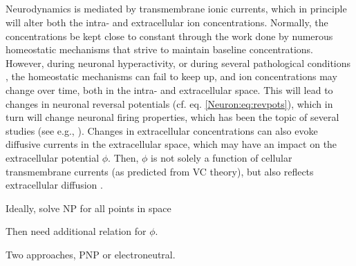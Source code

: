 {\subsection{}
Neurodynamics is mediated by transmembrane ionic currents, which in principle will alter both the intra- and extracellular ion concentrations. Normally, the concentrations be kept close to constant through the work done by numerous homeostatic mechanisms that strive to maintain baseline concentrations. However, during neuronal hyperactivity, or during several pathological conditions  \cite{Somjen2001, Frohlich2008, Zandt2015review, Ayata2015}, the homeostatic mechanisms can fail to keep up, and ion concentrations may change over time, both in the intra- and extracellular space. This will lead to changes in neuronal reversal potentials (cf. eq. \ref{Neuron:eq:revpots}), which in turn will change neuronal firing properties, which has been the topic of several studies (see e.g., \cite{Qian1989, Cressman2009, Oyehaug2009, Zandt2011, Saetra2020}). Changes in extracellular concentrations can also evoke diffusive currents in the extracellular space, which may have an impact on the extracellular potential $\phi$. Then, $\phi$ is not solely a function of cellular transmembrane currents (as predicted from VC theory), but also reflects extracellular diffusion \cite{Halnes2016}.

Ideally, solve NP for all points in space

Then need additional relation for $\phi$. 

Two approaches, PNP or electroneutral. 


\subsubsection{}

\subsubsection{}

\subsubsection{}






\subsection{}

}
